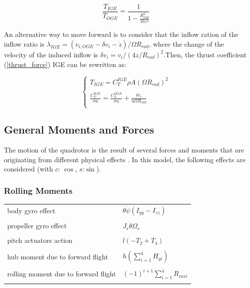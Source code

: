 \documentclass{thesisreport}
\begin{document}
\begin{equation}\label{Cheeseman}
\frac{T_{IGE}}{T_{OGE}}=\frac{1}{1-\frac{R^2_{rad}}{16 z^2}}
\end{equation}

An alternative way to move forward is to consider that the inflow ration of the inflow ratio is $\lambda_{IGE} = (v_{i,OGE}-\delta v_i - \dot{z})/\Omega R_{rad}$, where the change of the velocity of the induced inflow is $\delta v_i = v_i/(4z/R_{rad})^2$.Then, the thrust coefficient (\ref{thrust_force}) IGE can be rewritten  as:

\begin{equation}
\begin{cases}
T_{IGE}=C_T^{IGE} \rho A(\Omega R_{rad})^2 \\
\\
\frac{C_T^{IGE}}{\sigma a} = \frac{C_T^{OGE}}{\sigma a} + \frac{\delta v_i}{4 \Omega R_{rad}}\\
\end{cases}
\end{equation} 


\newpage

\subsection{General Moments and Forces}\label{forces_and_moments}

The motion of the quadrotor is the result of several forces and moments that are originating from different physical effects \cite{Bouabdalla2007}. In this model, the following effects are considered (with $c$: $\cos$, $s$:$\sin$).

\subsubsection*{Rolling Moments}

\setlength{\tabcolsep}{20pt}
 \begin{tabular}{lp{}}
  body gyro effect & $\dot{\theta}\dot{\psi}(I_{yy}-I_{zz})$\\
  \\
  propeller gyro effect & $J_r \dot{\theta}\Omega_r$\\
  \\
  pitch actuators action & $l(-T_2+T_4)$\\
  \\
  hub moment due to forward flight & $h(\sum_{i=1}^4 H_{yi})$\\
  \\
  rolling moment due to forward flight & $(-1)^{i+1}\sum_{i=1}^4 R_{mxi}$\\
  \\
\end{tabular}
\end{document}
